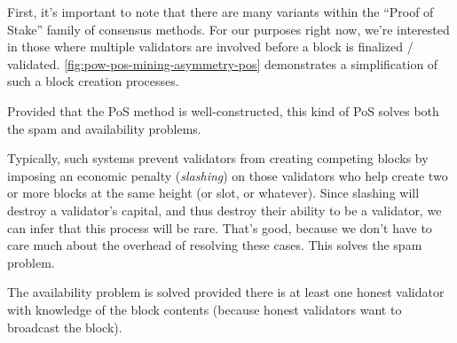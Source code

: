
First, it's important to note that there are many variants within the ``Proof of Stake'' family of consensus methods.
For our purposes right now, we're interested in those where multiple validators are involved before a block is finalized / validated.
\autoref{fig:pow-pos-mining-asymmetry-pos} demonstrates a simplification of such a block creation processes.

Provided that the PoS method is well-constructed, this kind of PoS solves both the spam and availability problems.

Typically, such systems prevent validators from creating competing blocks by imposing an economic penalty (\emph{slashing}) on those validators who help create two or more blocks at the same height (or slot, or whatever).
Since slashing will destroy a validator's capital, and thus destroy their ability to be a validator, we can infer that this process will be rare.
That's good, because we don't have to care much about the overhead of resolving these cases.
This solves the spam problem.

The availability problem is solved provided there is at least one honest validator with knowledge of the block contents (because honest validators want to broadcast the block).


